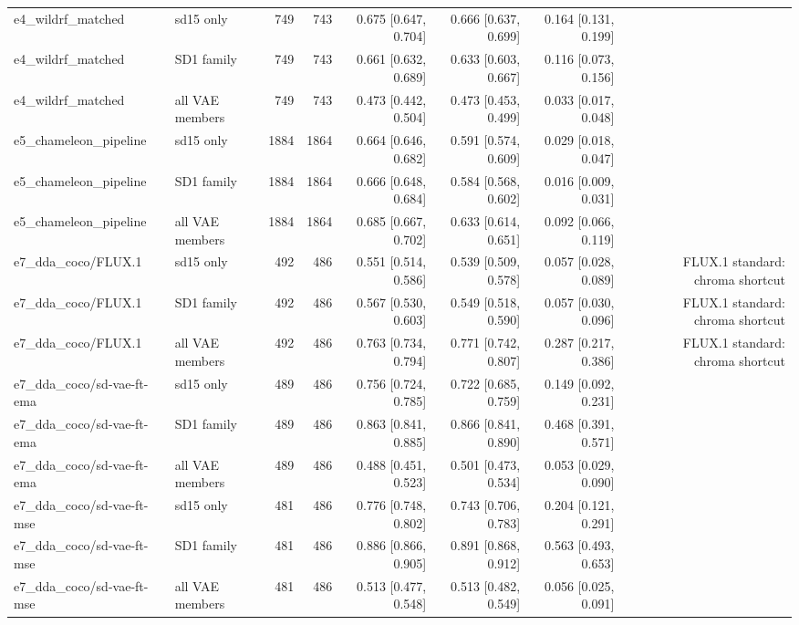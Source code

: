 \begin{table}[htbp]
\begin{tabular}{llrrrrrrr}
e4\_wildrf\_matched & sd15 only & 749 & 743 & 0.675 [0.647, 0.704] & 0.666 [0.637, 0.699] & 0.164 [0.131, 0.199] &  &  \\
e4\_wildrf\_matched & SD1 family & 749 & 743 & 0.661 [0.632, 0.689] & 0.633 [0.603, 0.667] & 0.116 [0.073, 0.156] &  &  \\
e4\_wildrf\_matched & all VAE members & 749 & 743 & 0.473 [0.442, 0.504] & 0.473 [0.453, 0.499] & 0.033 [0.017, 0.048] &  &  \\
e5\_chameleon\_pipeline & sd15 only & 1884 & 1864 & 0.664 [0.646, 0.682] & 0.591 [0.574, 0.609] & 0.029 [0.018, 0.047] &  &  \\
e5\_chameleon\_pipeline & SD1 family & 1884 & 1864 & 0.666 [0.648, 0.684] & 0.584 [0.568, 0.602] & 0.016 [0.009, 0.031] &  &  \\
e5\_chameleon\_pipeline & all VAE members & 1884 & 1864 & 0.685 [0.667, 0.702] & 0.633 [0.614, 0.651] & 0.092 [0.066, 0.119] &  &  \\
e7\_dda\_coco/FLUX.1 & sd15 only & 492 & 486 & 0.551 [0.514, 0.586] & 0.539 [0.509, 0.578] & 0.057 [0.028, 0.089] &  & FLUX.1 standard: chroma shortcut \\
e7\_dda\_coco/FLUX.1 & SD1 family & 492 & 486 & 0.567 [0.530, 0.603] & 0.549 [0.518, 0.590] & 0.057 [0.030, 0.096] &  & FLUX.1 standard: chroma shortcut \\
e7\_dda\_coco/FLUX.1 & all VAE members & 492 & 486 & 0.763 [0.734, 0.794] & 0.771 [0.742, 0.807] & 0.287 [0.217, 0.386] &  & FLUX.1 standard: chroma shortcut \\
e7\_dda\_coco/sd-vae-ft-ema & sd15 only & 489 & 486 & 0.756 [0.724, 0.785] & 0.722 [0.685, 0.759] & 0.149 [0.092, 0.231] &  &  \\
e7\_dda\_coco/sd-vae-ft-ema & SD1 family & 489 & 486 & 0.863 [0.841, 0.885] & 0.866 [0.841, 0.890] & 0.468 [0.391, 0.571] &  &  \\
e7\_dda\_coco/sd-vae-ft-ema & all VAE members & 489 & 486 & 0.488 [0.451, 0.523] & 0.501 [0.473, 0.534] & 0.053 [0.029, 0.090] &  &  \\
e7\_dda\_coco/sd-vae-ft-mse & sd15 only & 481 & 486 & 0.776 [0.748, 0.802] & 0.743 [0.706, 0.783] & 0.204 [0.121, 0.291] &  &  \\
e7\_dda\_coco/sd-vae-ft-mse & SD1 family & 481 & 486 & 0.886 [0.866, 0.905] & 0.891 [0.868, 0.912] & 0.563 [0.493, 0.653] &  &  \\
e7\_dda\_coco/sd-vae-ft-mse & all VAE members & 481 & 486 & 0.513 [0.477, 0.548] & 0.513 [0.482, 0.549] & 0.056 [0.025, 0.091] &  &  \\

\end{tabular}
\end{table}
